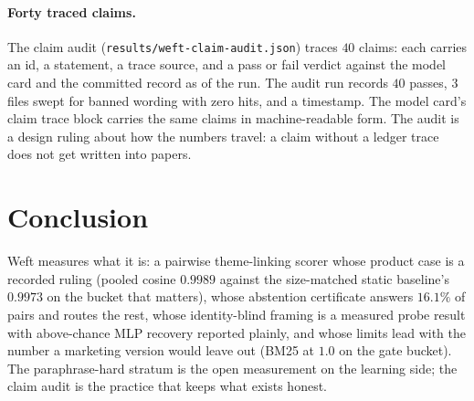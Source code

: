 \documentclass{article}
\begin{document}
\paragraph{Forty traced claims.}
The claim audit (\texttt{results/weft-claim-audit.json}) traces $40$ claims: each carries an id, a statement, a trace source, and a pass or fail verdict against the model card and the committed record as of the run. The audit run records $40$ passes, $3$ files swept for banned wording with zero hits, and a timestamp. The model card's claim trace block carries the same claims in machine-readable form. The audit is a design ruling about how the numbers travel: a claim without a ledger trace does not get written into papers.

\section{Conclusion}
\label{sec:conclusion}

Weft measures what it is: a pairwise theme-linking scorer whose product case is a recorded ruling (pooled cosine $0.9989$ against the size-matched static baseline's $0.9973$ on the bucket that matters), whose abstention certificate answers $16.1\%$ of pairs and routes the rest, whose identity-blind framing is a measured probe result with above-chance MLP recovery reported plainly, and whose limits lead with the number a marketing version would leave out (BM25 at $1.0$ on the gate bucket). The paraphrase-hard stratum is the open measurement on the learning side; the claim audit is the practice that keeps what exists honest.



\end{document}
